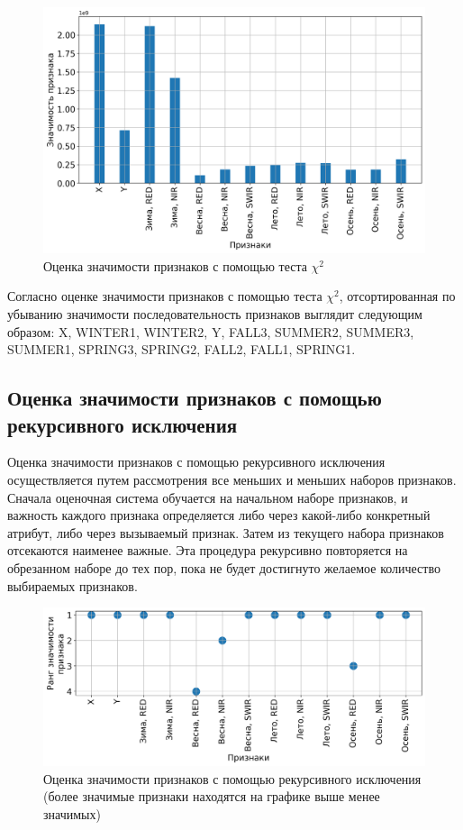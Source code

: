 \documentclass[14pt, a4paper, oneside]{extarticle}
\begin{document}
\begin{figure}[H]
    \caption{Оценка значимости признаков с помощью теста $\chi^2$}
    \centering
    \includegraphics[scale=0.6]{k-best-selector-feature-scores}
\end{figure}

Согласно оценке значимости признаков с помощью теста $\chi^2$, отсортированная по убыванию значимости последовательность признаков выглядит следующим образом: X, WINTER1, WINTER2, Y, FALL3, SUMMER2, SUMMER3, SUMMER1, SPRING3, SPRING2, FALL2, FALL1, SPRING1.

\subsection{Оценка значимости признаков с помощью рекурсивного исключения}

Оценка значимости признаков с помощью рекурсивного исключения осуществляется путем рассмотрения все меньших и меньших наборов признаков. Сначала оценочная система обучается на начальном наборе признаков, и важность каждого признака определяется либо через какой-либо конкретный атрибут, либо через вызываемый признак. Затем из текущего набора признаков отсекаются наименее важные. Эта процедура рекурсивно повторяется на обрезанном наборе до тех пор, пока не будет достигнуто желаемое количество выбираемых признаков.

\begin{figure}[H]
    \caption{Оценка значимости признаков с помощью рекурсивного исключения (более значимые признаки находятся на графике выше менее значимых)}
    \centering
    \includegraphics[scale=0.6]{rfe-selector-feature-ranking}
\end{figure}
\newpage
\end{document}
